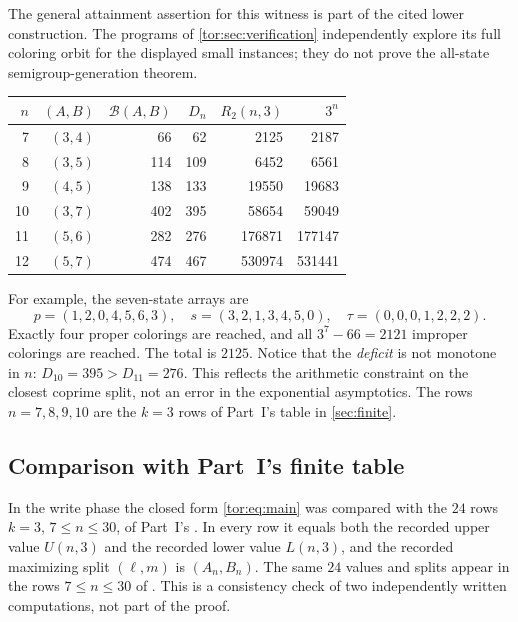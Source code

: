 \documentclass[11pt,a4paper]{article}
\numberwithin{equation}{section}
\theoremstyle{definition}
\theoremstyle{remark}
\newcommand{\Bip}{\mathcal B}
\begin{document}
The general attainment assertion for this witness is part of the cited lower
construction. The programs of \cref{tor:sec:verification} independently
explore its full coloring orbit for the displayed small instances; they do not
prove the all-state semigroup-generation theorem.

\begin{center}
\begin{tabular}{@{}rrrrrr@{}}
\toprule
$n$ & $(A,B)$ & $\Bip(A,B)$ & $D_n$ & $R_2(n,3)$ & $3^n$\\
\midrule
7 & $(3,4)$ & 66 & 62 & 2125 & 2187\\
8 & $(3,5)$ & 114 & 109 & 6452 & 6561\\
9 & $(4,5)$ & 138 & 133 & 19550 & 19683\\
10 & $(3,7)$ & 402 & 395 & 58654 & 59049\\
11 & $(5,6)$ & 282 & 276 & 176871 & 177147\\
12 & $(5,7)$ & 474 & 467 & 530974 & 531441\\
\bottomrule
\end{tabular}
\end{center}

For example, the seven-state arrays are
\[
 p=(1,2,0,4,5,6,3),\quad s=(3,2,1,3,4,5,0),\quad
 \tau=(0,0,0,1,2,2,2).
\]
Exactly four proper colorings are reached, and all $3^7-66=2121$ improper
colorings are reached. The total is $2125$. Notice that the \emph{deficit} is
not monotone in $n$: $D_{10}=395>D_{11}=276$. This reflects the arithmetic
constraint on the closest coprime split, not an error in the exponential
asymptotics. The rows $n=7,8,9,10$ are the $k=3$ rows of Part~I's table in
\cref{sec:finite}.

\subsection{Comparison with Part~I's finite table}\label{tor:sec:rowcheck}

In the write phase the closed form \eqref{tor:eq:main} was compared with the
$24$ rows $k=3$, $7\le n\le30$, of Part~I's
. In every row it equals both the recorded
upper value $U(n,3)$ and the recorded lower value $L(n,3)$, and the recorded
maximizing split $(\ell,m)$ is $(A_n,B_n)$. The same $24$ values and splits
appear in the rows $7\le n\le30$ of
. This is a consistency check
of two independently written computations, not part of the proof.
\end{document}
